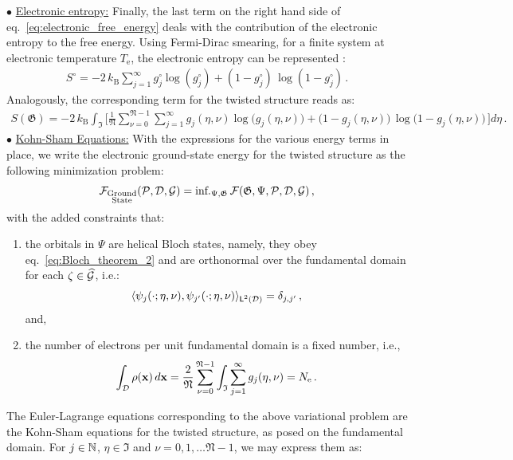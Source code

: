 \documentclass[preprint,12pt, 3p, sort&compress]{elsarticle}
\begin{document}
$\bullet$ \underline{Electronic entropy:} Finally, the last term on the right hand side of eq.~\ref{eq:electronic_free_energy} deals with the contribution of the electronic entropy to the free energy. Using Fermi-Dirac smearing, for a finite system at electronic temperature $T_{\text{e}}$, the electronic entropy can be represented :
\begin{align}
S^{\circ} = -2\,k_{\text{B}}\sum_{j=1}^{\infty} g_j^{\circ} \log(g_j^{\circ}) + (1 - g_j^{\circ})\,\log(1 - g_j^{\circ})\,.
\end{align}
Analogously, the corresponding term for the twisted structure reads as:
\begin{align}
S(\mathfrak{G}) = -2\,k_{\text{B}} {\int_{\mathfrak{I}}\bigg[\frac{1}{\mathfrak{N}}\sum_{\nu = 0}^{\mathfrak{N}-1}}\sum_{j=1}^{\infty} g_j(\eta, \nu) \log\big(g_j(\eta, \nu)\big) + \big(1 - g_j(\eta, \nu)\big)\,\log\big(1 - g_j(\eta, \nu)\big)\, \bigg]{d\eta}\,.
\end{align}
$\bullet$ \underline{Kohn-Sham Equations:} With the expressions for the various energy terms in place, we write the electronic ground-state energy for the twisted structure as the following minimization problem:
\begin{align}
{{\cal F}}_{\substack{\text{Ground}\\ \text{State}}}({\cal P} , {\cal D}, {\cal G}) = \text{inf.}_{{\Psi,\mathfrak{G}}}\,{{\cal F}}(\mathfrak{G}, \Psi, {\cal P}, {\cal D}, {\cal G})\,,
\end{align}
with the added constraints that:  
\begin{enumerate}
\item the orbitals in $\Psi$ are helical Bloch states, namely, they obey eq.~\ref{eq:Bloch_theorem_2} and are orthonormal over the fundamental domain for each $\zeta \in \widehat{{\cal G}}$, i.e.:
\begin{align}
\label{eq:orthonormality}
\langle\psi_j(\cdot;\eta, \nu),\psi_{j'}(\cdot;\eta, \nu)\rangle_{\textsf{L}^{2}_{}({\cal D})} = \delta_{j,{j'}}\,,
\end{align}
and,
\item the number of electrons per unit fundamental domain is a fixed number, i.e., 
\begin{align}
\label{eq:electrons_per_unit_cell}
\int_{{\cal D}} \rho({\bf x})\,d{\bf x} = \frac{2}{\mathfrak{N}}\sum_{\nu = 0}^{\mathfrak{N}-1} \int_{\mathfrak{I}}\sum_{j=1}^{\infty} g_j(\eta, \nu) = N_{\text{e}}\,.
\end{align}
\end{enumerate}
The Euler-Lagrange equations corresponding to the above variational problem are the Kohn-Sham equations for the twisted structure, as posed on the fundamental domain.  For $j\in\mathbb{N}$, $\eta \in\mathfrak{I}$ and $\nu = 0,1,\ldots \mathfrak{N}-1$, we may express them as:
\end{document}
